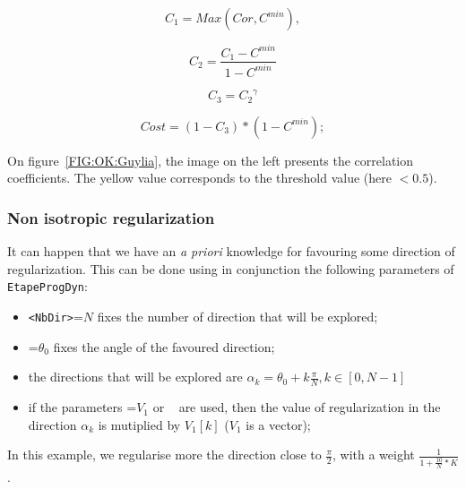 \begin{equation}
    C_1=Max(Cor,C^{min}) ,
\end{equation}

\begin{equation}
   C_2 = \frac{C_1 -C^{min}}{1-C^{min}}
\end{equation}

\begin{equation}
   C_3 = {C_2} ^\gamma
\end{equation}

\begin{equation}
   Cost  = (1-C_3) * (1-C^{min});
\end{equation}

On figure~\ref{FIG:OK:Guylia}, the image on the left presents the correlation coefficients. The yellow value corresponds to the threshold value (here $<0.5$).


\subsubsection{Non isotropic regularization}

It can happen that we have an \emph{a priori} knowledge for favouring some direction of regularization.
This can be done using in conjunction the following parameters of {\tt EtapeProgDyn}:

\begin{itemize}
   \item  {\tt  <NbDir>}=$N$  fixes the number of direction that will be explored;
   \item  {\tt  <Teta0>}=$\theta_0$  fixes the angle of the favoured direction;
   \item  the directions that will be explored are $\alpha_k=\theta_0 + k\frac{\pi}{N} , k\in[0,N-1]$
   \item if the parameters  {\tt <Px1MultRegul>}=$V_1$ or {\tt <Px2MultRegul> } are used, then the value
         of regularization in the direction  $\alpha_k$ is  mutiplied by $V_1[k]$ ($V_1$ is a vector);
\end{itemize}

In this example, we regularise more the direction close to $\frac{\pi}{2}$, with a weight
$\frac{1}{1+\frac{10}{N}*K}$.




